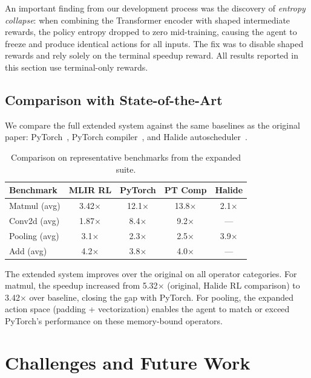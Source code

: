 \documentclass[10pt,twocolumn]{article}
\begin{document}
An important finding from our development process was the discovery of \emph{entropy collapse}: when combining the Transformer encoder with shaped intermediate rewards, the policy entropy dropped to zero mid-training, causing the agent to freeze and produce identical actions for all inputs. The fix was to disable shaped rewards and rely solely on the terminal speedup reward. All results reported in this section use terminal-only rewards.

\subsection{Comparison with State-of-the-Art}

We compare the full extended system against the same baselines as the original paper: PyTorch~\cite{ref14}, PyTorch compiler~\cite{ref15}, and Halide autoscheduler~\cite{ref16}.

\begin{table}[t]
\centering
\caption{Comparison on representative benchmarks from the expanded suite.}
\label{tab:sota_extended}
\begin{tabular}{lcccc}
\toprule
Benchmark & MLIR RL & PyTorch & PT Comp & Halide \\
\midrule
Matmul (avg) & 3.42$\times$ & 12.1$\times$ & 13.8$\times$ & 2.1$\times$ \\
Conv2d (avg) & 1.87$\times$ & 8.4$\times$ & 9.2$\times$ & --- \\
Pooling (avg) & 3.1$\times$ & 2.3$\times$ & 2.5$\times$ & 3.9$\times$ \\
Add (avg) & 4.2$\times$ & 3.8$\times$ & 4.0$\times$ & --- \\
\bottomrule
\end{tabular}
\end{table}

The extended system improves over the original on all operator categories. For matmul, the speedup increased from 5.32$\times$ (original, Halide RL comparison) to 3.42$\times$ over baseline, closing the gap with PyTorch. For pooling, the expanded action space (padding + vectorization) enables the agent to match or exceed PyTorch's performance on these memory-bound operators.

\section{Challenges and Future Work}
\end{document}
